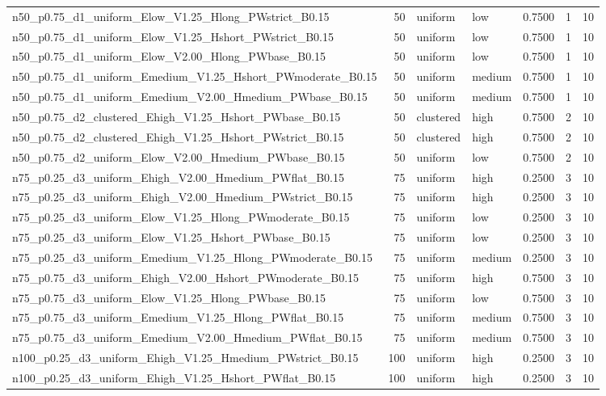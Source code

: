 \begin{tabular}{lrllrrr}
n50_p0.75_d1_uniform_Elow_V1.25_Hlong_PWstrict_B0.15 & 50 & uniform & low & 0.7500 & 1 & 10 \\
n50_p0.75_d1_uniform_Elow_V1.25_Hshort_PWstrict_B0.15 & 50 & uniform & low & 0.7500 & 1 & 10 \\
n50_p0.75_d1_uniform_Elow_V2.00_Hlong_PWbase_B0.15 & 50 & uniform & low & 0.7500 & 1 & 10 \\
n50_p0.75_d1_uniform_Emedium_V1.25_Hshort_PWmoderate_B0.15 & 50 & uniform & medium & 0.7500 & 1 & 10 \\
n50_p0.75_d1_uniform_Emedium_V2.00_Hmedium_PWbase_B0.15 & 50 & uniform & medium & 0.7500 & 1 & 10 \\
n50_p0.75_d2_clustered_Ehigh_V1.25_Hshort_PWbase_B0.15 & 50 & clustered & high & 0.7500 & 2 & 10 \\
n50_p0.75_d2_clustered_Ehigh_V1.25_Hshort_PWstrict_B0.15 & 50 & clustered & high & 0.7500 & 2 & 10 \\
n50_p0.75_d2_uniform_Elow_V2.00_Hmedium_PWbase_B0.15 & 50 & uniform & low & 0.7500 & 2 & 10 \\
n75_p0.25_d3_uniform_Ehigh_V2.00_Hmedium_PWflat_B0.15 & 75 & uniform & high & 0.2500 & 3 & 10 \\
n75_p0.25_d3_uniform_Ehigh_V2.00_Hmedium_PWstrict_B0.15 & 75 & uniform & high & 0.2500 & 3 & 10 \\
n75_p0.25_d3_uniform_Elow_V1.25_Hlong_PWmoderate_B0.15 & 75 & uniform & low & 0.2500 & 3 & 10 \\
n75_p0.25_d3_uniform_Elow_V1.25_Hshort_PWbase_B0.15 & 75 & uniform & low & 0.2500 & 3 & 10 \\
n75_p0.25_d3_uniform_Emedium_V1.25_Hlong_PWmoderate_B0.15 & 75 & uniform & medium & 0.2500 & 3 & 10 \\
n75_p0.75_d3_uniform_Ehigh_V2.00_Hshort_PWmoderate_B0.15 & 75 & uniform & high & 0.7500 & 3 & 10 \\
n75_p0.75_d3_uniform_Elow_V1.25_Hlong_PWbase_B0.15 & 75 & uniform & low & 0.7500 & 3 & 10 \\
n75_p0.75_d3_uniform_Emedium_V1.25_Hlong_PWflat_B0.15 & 75 & uniform & medium & 0.7500 & 3 & 10 \\
n75_p0.75_d3_uniform_Emedium_V2.00_Hmedium_PWflat_B0.15 & 75 & uniform & medium & 0.7500 & 3 & 10 \\
n100_p0.25_d3_uniform_Ehigh_V1.25_Hmedium_PWstrict_B0.15 & 100 & uniform & high & 0.2500 & 3 & 10 \\
n100_p0.25_d3_uniform_Ehigh_V1.25_Hshort_PWflat_B0.15 & 100 & uniform & high & 0.2500 & 3 & 10 \\

\end{tabular}
